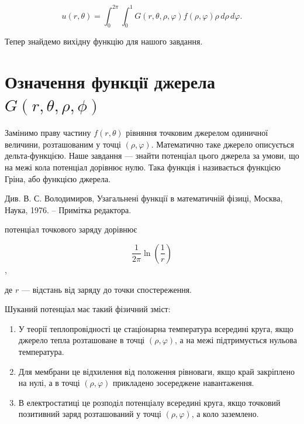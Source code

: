 \documentclass[
  ukrainian,
]{article}
\providecommand{\tightlist}{%
  \setlength{\itemsep}{0pt}\setlength{\parskip}{0pt}}
\begin{document}
\begin{equation*}
u\left(r,\theta\right) = \int_{0}^{2\pi} \int_{0}^{1} G\left(r,\theta,\rho,\varphi\right) f\left(\rho,\varphi\right)\rho\, d\rho\, d\varphi.
\end{equation*}

Тепер знайдемо вихідну функцію для нашого завдання.

\section{\texorpdfstring{Означення функції джерела
\(G(r, \theta, \rho, \phi)\)}{Означення функції джерела G(r, \textbackslash theta, \textbackslash rho, \textbackslash phi)}}\label{ux43eux437ux43dux430ux447ux435ux43dux43dux44f-ux444ux443ux43dux43aux446ux456ux457-ux434ux436ux435ux440ux435ux43bux430-gr-theta-rho-phi}

Замінимо праву частину \(f(r,\theta)\) рівняння точковим джерелом
одиничної величини, розташованим у точці \((\rho, \varphi)\).
Математично таке джерело описується дельта-функцією. Наше завдання ---
знайти потенціал цього джерела за умови, що на межі кола потенціал
дорівнює нулю. Така функція і називається функцією Гріна, або функцією
джерела.

Див. В. С. Володимиров, Узагальнені функції в математичній фізиці,
Москва, Наука, 1976. -- Примітка редактора.

потенціал точкового заряду дорівнює

\begin{equation*}
\frac{1}{2\pi} \ln \left( \frac{1}{r} \right)
\end{equation*},

де \(r\) --- відстань від заряду до точки спостереження.

Шуканий потенціал має такий фізичний зміст:

\begin{enumerate}
\def\labelenumi{\arabic{enumi}.}
\tightlist
\item
  У теорії теплопровідності це стаціонарна температура всередині круга,
  якщо джерело тепла розташоване в точці \((\rho,\varphi)\), а на межі
  підтримується нульова температура.
\item
  Для мембрани це відхилення від положення рівноваги, якщо край
  закріплено на нулі, а в точці \((\rho,\varphi)\) прикладено
  зосереджене навантаження.
\item
  В електростатиці це розподіл потенціалу всередині круга, якщо точковий
  позитивний заряд розташований у точці \((\rho,\varphi)\), а коло
  заземлено.
\end{enumerate}
\end{document}
